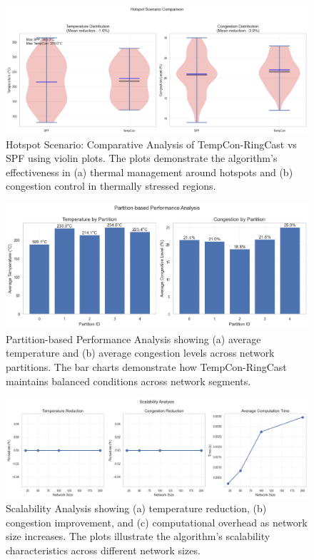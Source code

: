 \documentclass[12pt]{article}
\begin{document}
\begin{figure}[h]
    \centering
    \includegraphics[width=\linewidth]{hotspot_scenario_comparison.png}
    \caption{Hotspot Scenario: Comparative Analysis of TempCon-RingCast vs SPF using violin plots. The plots demonstrate the algorithm's effectiveness in (a) thermal management around hotspots and (b) congestion control in thermally stressed regions.}
    \label{fig:hotspot_scenario}
\end{figure}

\begin{figure}[h]
    \centering
    \includegraphics[width=\linewidth]{partition_analysis.png}
    \caption{Partition-based Performance Analysis showing (a) average temperature and (b) average congestion levels across network partitions. The bar charts demonstrate how TempCon-RingCast maintains balanced conditions across network segments.}
    \label{fig:partition_analysis}
\end{figure}

\begin{figure}[h]
    \centering
    \includegraphics[width=\linewidth]{scalability.png}
    \caption{Scalability Analysis showing (a) temperature reduction, (b) congestion improvement, and (c) computational overhead as network size increases. The plots illustrate the algorithm's scalability characteristics across different network sizes.}
    \label{fig:scalability}
\end{figure}
\end{document}
